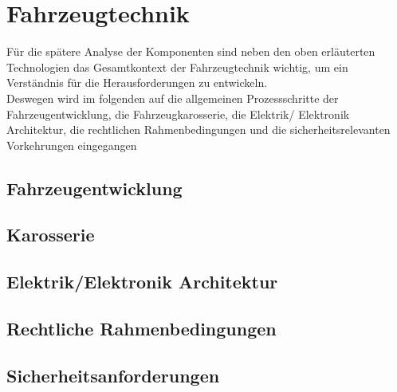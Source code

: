 \section{Fahrzeugtechnik}
Für die spätere Analyse der Komponenten sind neben den oben erläuterten Technologien das Gesamtkontext der Fahrzeugtechnik wichtig, um ein Verständnis für die Herausforderungen zu entwickeln.\\
Deswegen wird im folgenden auf die allgemeinen Prozessschritte der Fahrzeugentwicklung, die Fahrzeugkarosserie, die Elektrik/ Elektronik Architektur, die rechtlichen Rahmenbedingungen und die sicherheitsrelevanten Vorkehrungen eingegangen
\subsection{Fahrzeugentwicklung}
\subsection{Karosserie}
\subsection{Elektrik/Elektronik Architektur}

\subsection{Rechtliche Rahmenbedingungen}

\subsection{Sicherheitsanforderungen}